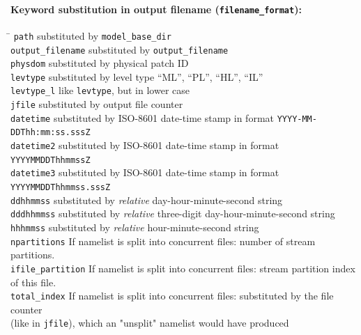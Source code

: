 \paragraph{Keyword substitution in output filename (\texttt{filename\_format}):}
\begin{tabbing}
\hspace*{0.4\textwidth} \= \kill
\texttt{path}              \>  substituted by \texttt{model\_base\_dir}                 \\
\texttt{output\_filename}  \>  substituted by \texttt{output\_filename}                 \\
\texttt{physdom}           \>  substituted by physical patch ID                         \\
\texttt{levtype}           \>  substituted by level type ``ML'', ``PL'', ``HL'', ``IL'' \\
\texttt{levtype\_l}        \>  like \texttt{levtype}, but in lower case                 \\
\texttt{jfile}             \>  substituted by output file counter                       \\
\texttt{datetime}          \>  substituted by ISO-8601 date-time stamp in format \texttt{YYYY-MM-DDThh:mm:ss.sssZ} \\
\texttt{datetime2}         \>  substituted by ISO-8601 date-time stamp in format \texttt{YYYYMMDDThhmmssZ}         \\
\texttt{datetime3}         \>  substituted by ISO-8601 date-time stamp in format \texttt{YYYYMMDDThhmmss.sssZ}     \\
\texttt{ddhhmmss}          \>  substituted by \emph{relative} day-hour-minute-second string \\
\texttt{dddhhmmss}         \>  substituted by \emph{relative} three-digit day-hour-minute-second string \\
\texttt{hhhmmss}           \>  substituted by \emph{relative} hour-minute-second string     \\
\texttt{npartitions}       \>  If namelist is split into concurrent files: number of stream partitions.           \\
\texttt{ifile\_partition}  \>  If namelist is split into concurrent files: stream partition index of this file.   \\
\texttt{total\_index}      \>  If namelist is split into concurrent files: substituted by the file counter \\
                           \>  (like in \texttt{jfile}), which an "unsplit" namelist would have produced
\end{tabbing}

